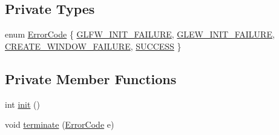\subsection*{Private Types}
\begin{DoxyCompactItemize}
\item 
enum \hyperlink{class_g_g_e_1_1_application_a39cb0a658b749fd014b3355c157d267b}{Error\+Code} \{ \hyperlink{class_g_g_e_1_1_application_a39cb0a658b749fd014b3355c157d267ba0af907f479a06dc7053089d490fbf955}{G\+L\+F\+W\+\_\+\+I\+N\+I\+T\+\_\+\+F\+A\+I\+L\+U\+R\+E}, 
\hyperlink{class_g_g_e_1_1_application_a39cb0a658b749fd014b3355c157d267ba09d66e7a4f11315fe476637fb687207f}{G\+L\+E\+W\+\_\+\+I\+N\+I\+T\+\_\+\+F\+A\+I\+L\+U\+R\+E}, 
\hyperlink{class_g_g_e_1_1_application_a39cb0a658b749fd014b3355c157d267ba740a2252d9dc7e54920205d1f28eb6a9}{C\+R\+E\+A\+T\+E\+\_\+\+W\+I\+N\+D\+O\+W\+\_\+\+F\+A\+I\+L\+U\+R\+E}, 
\hyperlink{class_g_g_e_1_1_application_a39cb0a658b749fd014b3355c157d267ba4a9d849e8ef967cc1138df428af830bb}{S\+U\+C\+C\+E\+S\+S}
 \}
\end{DoxyCompactItemize}
\subsection*{Private Member Functions}
\begin{DoxyCompactItemize}
\item 
int \hyperlink{class_g_g_e_1_1_application_a79675202f34d2d8105fbecb2ecc35db0}{init} ()
\item 
void \hyperlink{class_g_g_e_1_1_application_a9aa875072c65b2b59b1cbf231a949d21}{terminate} (\hyperlink{class_g_g_e_1_1_application_a39cb0a658b749fd014b3355c157d267b}{Error\+Code} e)
\end{DoxyCompactItemize}


